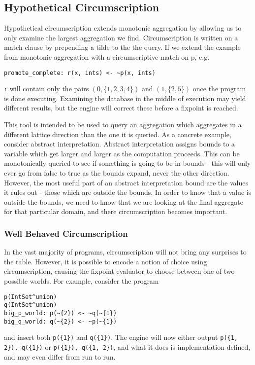 \subsection{Hypothetical Circumscription}
\label{holmes:sec:circ}
Hypothetical circumscription extends monotonic aggregation by allowing us to only examine the largest aggregation we find.
Circumscription is written on a match clause by prepending a tilde to the the query.
If we extend the example from monotonic aggregation with a circumscriptive match on p, e.g.
\begin{verbatim}
promote_complete: r(x, ints) <- ~p(x, ints)
\end{verbatim}
\texttt{r} will contain only the pairs $(0, \{1, 2, 3, 4\})$ and $(1, \{2, 5\})$ once the program is done executing.
Examining the database in the middle of execution may yield different results, but the engine will correct these before a fixpoint is reached.

This tool is intended to be used to query an aggregation which aggregates in a different lattice direction than the one it is queried.
As a concrete example, consider abstract interpretation.
Abstract interpretation assigns bounds to a variable which get larger and larger as the computation proceeds.
This can be monotonically queried to see if something is going to be in bounds - this will only ever go from false to true as the bounds expand, never the other direction.
However, the most useful part of an abstract interpretation bound are the values it rules out - those which are outside the bounds.
In order to know that a value is outside the bounds, we need to know that we are looking at the final aggregate for that particular domain, and there circumscription becomes important.

\subsubsection{Well Behaved Circumscription}
In the vast majority of programs, circumscription will not bring any surprises to the table.
However, it is possible to encode a notion of choice using circumscription, causing the fixpoint evaluator to choose between one of two possible worlds.
For example, consider the program
\begin{verbatim}
p(IntSet^union)
q(IntSet^union)
big_p_world: p(~{2}) <- ~q(~{1})
big_q_world: q(~{2}) <- ~p(~{1})
\end{verbatim}
and insert both \texttt{p(\{1\})} and \texttt{q(\{1\})}.
The engine will now either output \texttt{p(\{1, 2\}), q(\{1\})} or \texttt{p(\{1\}), q(\{1, 2\})}, and what it does is implementation defined, and may even differ from run to run.

